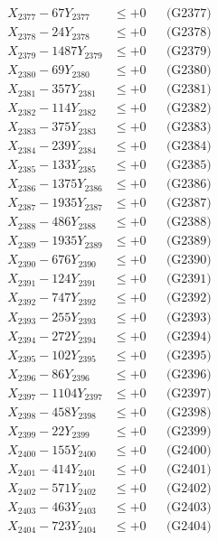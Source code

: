 \documentclass[a4paper,10pt]{article}
\begin{document}
{\begin{align}
X_{2377} - 67Y_{2377} &\leq +0 && \text{(G2377)} \\
X_{2378} - 24Y_{2378} &\leq +0 && \text{(G2378)} \\
X_{2379} - 1487Y_{2379} &\leq +0 && \text{(G2379)} \\
X_{2380} - 69Y_{2380} &\leq +0 && \text{(G2380)} \\
\allowbreak
X_{2381} - 357Y_{2381} &\leq +0 && \text{(G2381)} \\
X_{2382} - 114Y_{2382} &\leq +0 && \text{(G2382)} \\
X_{2383} - 375Y_{2383} &\leq +0 && \text{(G2383)} \\
X_{2384} - 239Y_{2384} &\leq +0 && \text{(G2384)} \\
X_{2385} - 133Y_{2385} &\leq +0 && \text{(G2385)} \\
X_{2386} - 1375Y_{2386} &\leq +0 && \text{(G2386)} \\
X_{2387} - 1935Y_{2387} &\leq +0 && \text{(G2387)} \\
X_{2388} - 486Y_{2388} &\leq +0 && \text{(G2388)} \\
X_{2389} - 1935Y_{2389} &\leq +0 && \text{(G2389)} \\
X_{2390} - 676Y_{2390} &\leq +0 && \text{(G2390)} \\
\allowbreak
X_{2391} - 124Y_{2391} &\leq +0 && \text{(G2391)} \\
X_{2392} - 747Y_{2392} &\leq +0 && \text{(G2392)} \\
X_{2393} - 255Y_{2393} &\leq +0 && \text{(G2393)} \\
X_{2394} - 272Y_{2394} &\leq +0 && \text{(G2394)} \\
X_{2395} - 102Y_{2395} &\leq +0 && \text{(G2395)} \\
X_{2396} - 86Y_{2396} &\leq +0 && \text{(G2396)} \\
X_{2397} - 1104Y_{2397} &\leq +0 && \text{(G2397)} \\
X_{2398} - 458Y_{2398} &\leq +0 && \text{(G2398)} \\
X_{2399} - 22Y_{2399} &\leq +0 && \text{(G2399)} \\
X_{2400} - 155Y_{2400} &\leq +0 && \text{(G2400)} \\
\allowbreak
X_{2401} - 414Y_{2401} &\leq +0 && \text{(G2401)} \\
X_{2402} - 571Y_{2402} &\leq +0 && \text{(G2402)} \\
X_{2403} - 463Y_{2403} &\leq +0 && \text{(G2403)} \\
X_{2404} - 723Y_{2404} &\leq +0 && \text{(G2404)} \\

\end{align}}
\end{document}
